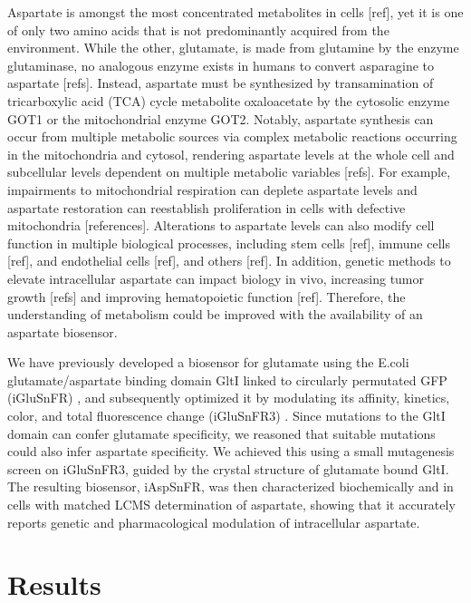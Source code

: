 \documentclass[9pt,lineno]{elife}
\begin{document}
Aspartate is amongst the most concentrated metabolites in cells [ref], yet it is one of only two amino acids that is not predominantly acquired from the environment.
While the other, glutamate, is made from glutamine by the enzyme glutaminase, no analogous enzyme exists in humans to convert asparagine to aspartate [refs].
Instead, aspartate must be synthesized by transamination of tricarboxylic acid (TCA) cycle metabolite oxaloacetate by the cytosolic enzyme GOT1 or the mitochondrial enzyme GOT2.
Notably, aspartate synthesis can occur from multiple metabolic sources via complex metabolic reactions occurring in the mitochondria and cytosol, rendering aspartate levels at the whole cell and subcellular levels dependent on multiple metabolic variables [refs].
For example, impairments to mitochondrial respiration can deplete aspartate levels and aspartate restoration can reestablish proliferation in cells with defective mitochondria [references].
Alterations to aspartate levels can also modify cell function in multiple biological processes, including stem cells [ref], immune cells [ref], and endothelial cells [ref], and others [ref].
In addition, genetic methods to elevate intracellular aspartate can impact biology in vivo, increasing tumor growth [refs] and improving hematopoietic function [ref].
Therefore, the understanding of metabolism could be improved with the availability of an aspartate biosensor. 

We have previously developed a biosensor for glutamate using the E.coli glutamate/aspartate binding domain GltI linked to circularly permutated GFP (iGluSnFR) \citep{Marvin2013-qq}, and subsequently optimized it by modulating its affinity, kinetics, color, and total fluorescence change (iGluSnFR3) \citep{Marvin2018-ks, Aggarwal2023-pi}.
Since mutations to the GltI domain can confer glutamate specificity, we reasoned that suitable mutations could also infer aspartate specificity.
We achieved this using a small mutagenesis screen on iGluSnFR3, guided by the crystal structure of glutamate bound GltI. The resulting biosensor, iAspSnFR, was then characterized biochemically and in cells with matched LCMS determination of aspartate, showing that it accurately reports genetic and pharmacological modulation of intracellular aspartate.




\section{Results}
\end{document}
